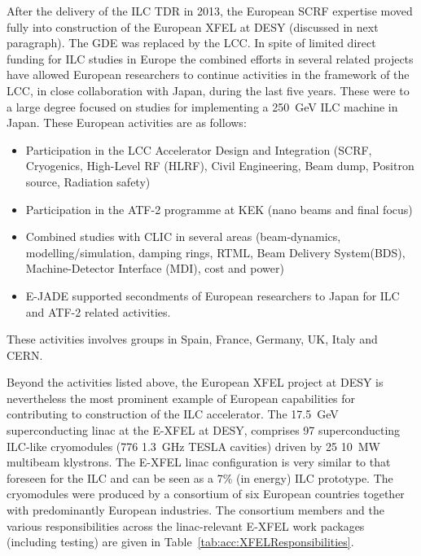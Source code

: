 \documentclass[%
 reprint,
 floatfix,
 amsmath,amssymb,
 aps,
]{revtex4-1}
\begin{document}
After the delivery of the ILC TDR in 2013, the European SCRF expertise moved fully into construction of the European XFEL at DESY (discussed in next paragraph). 
The GDE was replaced by the LCC. In spite of limited direct funding for ILC studies in Europe the combined efforts in 
several related projects have allowed European researchers to continue activities in the framework of the LCC, in close collaboration with Japan, during
the last five years. These were to a large degree focused on studies for implementing a 250~GeV ILC machine in Japan. 
These European activities are as follows:
\begin{itemize}
\item Participation in the LCC Accelerator Design and Integration (SCRF, Cryogenics, High-Level RF (HLRF), Civil Engineering, Beam dump, Positron source, Radiation safety)
\item Participation in the ATF-2 programme at KEK (nano beams and final focus)
\item Combined studies with CLIC in several areas (beam-dynamics, modelling/simulation, damping rings, RTML, Beam Delivery System(BDS), Machine-Detector Interface (MDI), cost and power)
\item E-JADE supported secondments of European researchers to Japan for ILC and ATF-2 related activities.
\end{itemize}
These activities involves groups in Spain, France, Germany, UK, Italy and CERN. 



Beyond the activities listed above, the European XFEL project at DESY is nevertheless the most prominent example of European capabilities 
for contributing to construction of the ILC accelerator.
The 17.5~GeV superconducting linac at the E-XFEL at DESY, comprises 97 superconducting ILC-like cryomodules (776 1.3~GHz TESLA cavities) 
driven by 25 10~MW multibeam klystrons. The E-XFEL linac configuration is very similar to that foreseen for the ILC and can be seen as a 7\% (in energy) 
ILC prototype. The cryomodules were produced by a consortium of six European countries together with predominantly European industries. 
 The consortium members and the various responsibilities across the linac-relevant E-XFEL work packages (including testing) are given in Table~\ref{tab:acc:XFELResponsibilities}.
\end{document}
